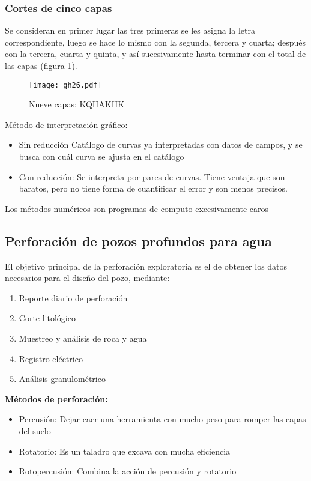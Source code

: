 \subsubsection{Cortes de cinco capas}
Se consideran en primer lugar las tres primeras  se les asigna la letra correspondiente, luego se hace lo mismo con la segunda, tercera y cuarta; después con la tercera, cuarta y quinta, y así sucesivamente hasta terminar con el total de las capas (figura \ref{gh26}).
\begin{figure}[h!]
\centering
  \texttt{[image: gh26.pdf]}
  \caption{Nueve capas: KQHAKHK}
  \label{gh26}
\end{figure}

Método de interpretación gráfico:
\begin{itemize}
    \item Sin reducción Catálogo de curvas ya interpretadas con datos de campos, y se busca con cuál curva se ajusta en el catálogo
    \item Con reducción: Se interpreta por pares de curvas. Tiene ventaja que son baratos, pero no tiene forma de cuantificar el error y son menos precisos.
\end{itemize}
Los métodos numéricos son programas de computo excesivamente caros

\subsection{Perforación de pozos profundos para agua}
El objetivo  principal de la perforación exploratoria es el de obtener los datos necesarios para el diseño del pozo, mediante:
\begin{enumerate}
    \item Reporte diario de perforación
    \item Corte litológico
    \item Muestreo y análisis de roca y agua
    \item Registro eléctrico
    \item Análisis granulométrico
\end{enumerate}
\textbf{Métodos de perforación:}
\begin{itemize}
    \item Percusión: Dejar caer una herramienta con mucho peso para romper las capas del suelo
    \item Rotatorio: Es un taladro que excava con mucha eficiencia 
    \item Rotopercusión: Combina la acción de percusión y rotatorio
\end{itemize}
